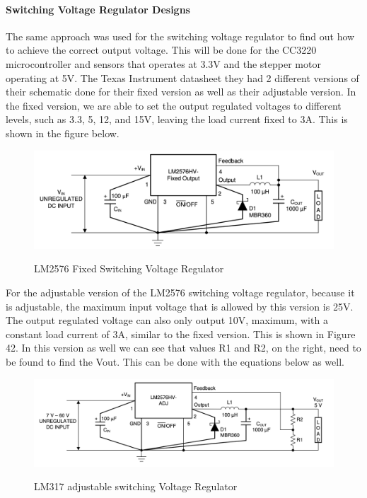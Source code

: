 \paragraph{Switching Voltage Regulator Designs}
The same approach was used for the switching voltage regulator to find out how to achieve the correct output voltage. This will be done for the CC3220 microcontroller and sensors that operates at 3.3V and the stepper motor operating at 5V. The Texas Instrument datasheet they had 2 different versions of their schematic done for their fixed version as well as their adjustable version. In the fixed version, we are able to set the output regulated voltages to different levels, such as 3.3, 5, 12, and 15V, leaving the load current fixed to 3A. This is shown in the figure below.\par
\begin{figure}[H]
    \centering
    \caption{LM2576 Fixed Switching Voltage Regulator}
    \includegraphics[width=\textwidth]{images/LM2576_Fixed.png}
    \label{fig:fixed-switching-voltage-regulator}
\end{figure}
For the adjustable version of the LM2576 switching voltage regulator, because it is adjustable, the maximum input voltage that is allowed by this version is 25V. The output regulated voltage can also only output 10V, maximum, with a constant load current of 3A, similar to the fixed version. This is shown in Figure 42. In this version as well we can see that values R1 and R2, on the right, need to be found to find the Vout. This can be done with the equations below as well.\par
\begin{figure}[H]
    \centering
    \caption{LM317 adjustable switching Voltage Regulator}
    \includegraphics[width=\textwidth]{images/LM2576_Adjustable.png}
    \label{fig:adj-switching-voltage-regulator}
\end{figure}

